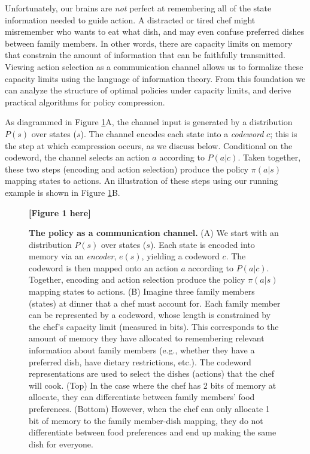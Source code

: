 \documentclass[11pt]{article}
\begin{document}
Unfortunately, our brains are \textit{not} perfect at remembering all of the state information needed to guide action. A distracted or tired chef might misremember who wants to eat what dish, and may even confuse preferred dishes between family members. In other words, there are capacity limits on memory that constrain the amount of information that can be faithfully transmitted. Viewing action selection as a communication channel allows us to formalize these capacity limits using the language of information theory. From this foundation we can analyze the structure of optimal policies under capacity limits, and derive practical algorithms for policy compression.

As diagrammed in Figure \ref{fig:diagram}A, the channel input is generated by a distribution $P(s)$ over states ($s$). The channel encodes each state into a \emph{codeword} $c$; this is the step at which compression occurs, as we discuss below. Conditional on the codeword, the channel selects an action $a$ according to $P(a|c)$. Taken together, these two steps (encoding and action selection) produce the policy $\pi(a|s)$ mapping states to actions. An illustration of these steps using our running example is shown in Figure \ref{fig:diagram}B.

\begin{figure}
    \centering
    \textbf{[Figure 1 here]}
    \caption{\textbf{The policy as a communication channel.} (A) We start with an distribution $P(s)$ over states ($s$). Each state is encoded into memory via an \textit{encoder}, $e(s)$, yielding a codeword $c$. The codeword is then mapped onto an action $a$ according to $P(a|c)$. Together, encoding and action selection produce the policy $\pi(a|s)$ mapping states to actions. (B) Imagine three family members (states) at dinner that a chef must account for. Each family member can be represented by a codeword, whose length is constrained by the chef's capacity limit (measured in bits). This corresponds to the amount of memory they have allocated to remembering relevant information about family members (e.g., whether they have a preferred dish, have dietary restrictions, etc.). The codeword representations are used to select the dishes (actions) that the chef will cook. (Top) In the case where the chef has 2 bits of memory at allocate, they can differentiate between family members' food preferences. (Bottom) However, when the chef can only allocate 1 bit of memory to the family member-dish mapping, they do not differentiate between food preferences and end up making the same dish for everyone.}
    \label{fig:diagram}
\end{figure}
\end{document}
